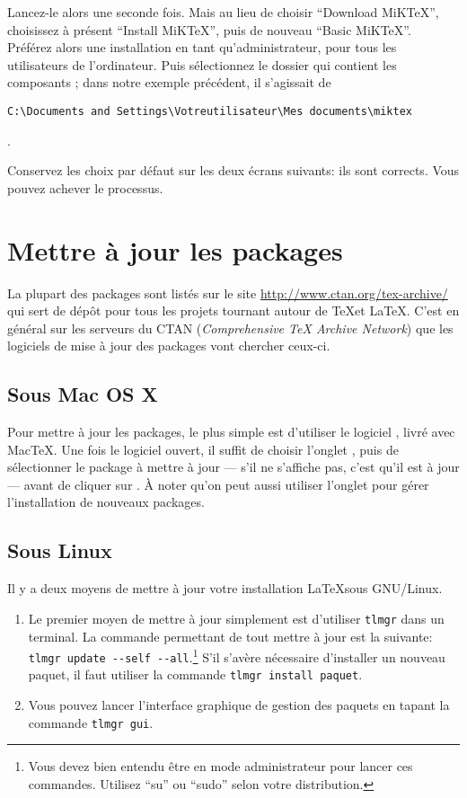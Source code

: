 Lancez-le alors une seconde fois. Mais au lieu de choisir \enquote{Download MiKTeX}, choisissez à présent \enquote{Install MiKTeX}, puis de nouveau \enquote{Basic MiKTeX}. Préférez alors une installation en tant qu'administrateur, pour tous les utilisateurs de l'ordinateur. Puis sélectionnez le dossier qui contient les composants ; dans notre exemple précédent, il s'agissait de \begin{english}\verb|C:\Documents and Settings\Votreutilisateur\Mes documents\miktex|\end{english}.

Conservez les choix par défaut sur les deux écrans suivants: ils sont corrects. Vous pouvez achever le processus.







\section{Mettre à jour les packages}\label{maj}

La plupart des packages sont listés sur le site \url{http://www.ctan.org/tex-archive/} qui sert de dépôt pour tous les projets tournant autour de \TeX et \LaTeX. C'est  en général sur les serveurs du CTAN (\textenglish{\emph{Comprehensive TeX Archive Network}}) que les logiciels de mise à jour des packages vont chercher  ceux-ci.

\subsection{Sous Mac OS X}\label{majosX}

Pour mettre à jour les packages, le plus simple est d'utiliser le logiciel , livré avec MacTeX. Une fois le logiciel ouvert, il suffit  de choisir l'onglet , puis de sélectionner le package à mettre à jour --- s'il ne s'affiche pas, c'est qu'il est à jour --- avant de cliquer sur . À noter qu'on peut aussi utiliser l'onglet  pour gérer l'installation de nouveaux packages.

\subsection{Sous Linux}

Il y a deux moyens de mettre à jour votre installation \LaTeX sous GNU/Linux.

\begin{enumerate}
\item Le premier moyen de mettre à jour simplement est d'utiliser \verb|tlmgr| dans un terminal. La commande permettant de tout mettre à jour est la suivante:
\verb|tlmgr update --self --all|.\footnote{Vous devez bien entendu être en mode administrateur pour lancer ces commandes. Utilisez \enquote{su} ou \enquote{sudo} selon votre distribution.} S'il s'avère nécessaire d'installer un nouveau paquet, il faut utiliser la commande \verb|tlmgr install paquet|.
\item Vous pouvez lancer l'interface graphique de gestion des paquets en tapant la commande \verb|tlmgr gui|.
\end{enumerate}

